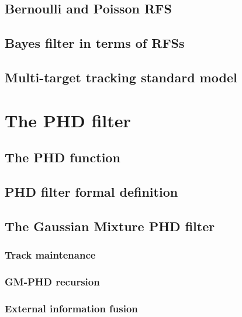 \documentclass[english,master,unicode]{ctufit-thesis}
\theoremstyle{plain}
\theoremstyle{definition}
\theoremstyle{remark}
\numberwithin{theorem}{chapter}
\begin{document}
        \subsection{Bernoulli and Poisson RFS}\label{sec:bernoulli-poisson-rfs}
            
        \subsection{Bayes filter in terms of RFSs}\label{sec:bayes-filter-rfs}
            
        \subsection{Multi-target tracking standard model}\label{sec:mtt-standard-model}
            
    \section{The PHD filter}\label{sec:phd-filter}
        
        \subsection{The PHD function}\label{sec:phd-function}
            
        \subsection{PHD filter formal definition}\label{sec:phd-filter-formal}
            
        \subsection{The Gaussian Mixture PHD filter}\label{sec:gm-phd}
            
            \subsubsection{Track maintenance}\label{sec:track-maintenance}
                
            \subsubsection{GM-PHD recursion}\label{sec:gm-phd-recursion}
                
            \subsubsection{External information fusion}\label{sec:gm-phd-fusion}
                
        
\end{document}
